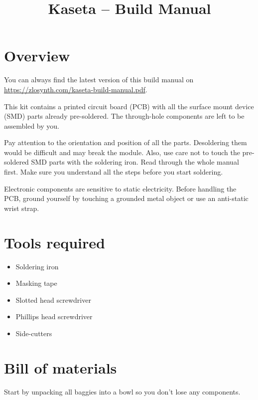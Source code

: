 \documentclass[10pt,a4paper,twocolumn]{article}
\begin{document}
\title{Kaseta -- Build Manual}
\author{}
\date{}

\maketitle

\section{Overview}

You can always find the latest version of this build manual on
\url{https://zlosynth.com/kaseta-build-manual.pdf}.

This kit contains a printed circuit board (PCB) with all the surface mount
device (SMD) parts already pre-soldered. The through-hole components are left to
be assembled by you.

Pay attention to the orientation and position of all the parts. Desoldering them
would be difficult and may break the module. Also, use care not to touch the
pre-soldered SMD parts with the soldering iron. Read through the whole manual
first. Make sure you understand all the steps before you start soldering.

Electronic components are sensitive to static electricity. Before handling the PCB, ground yourself by touching a grounded metal object or use an anti-static wrist strap.

\newpage

\section{Tools required}

\begin{itemize}
  \item Soldering iron
  \item Masking tape
  \item Slotted head screwdriver
  \item Phillips head screwdriver
  \item Side-cutters
\end{itemize}

\newpage

\section{Bill of materials}

Start by unpacking all baggies into a bowl so you don't lose any components.
\end{document}
